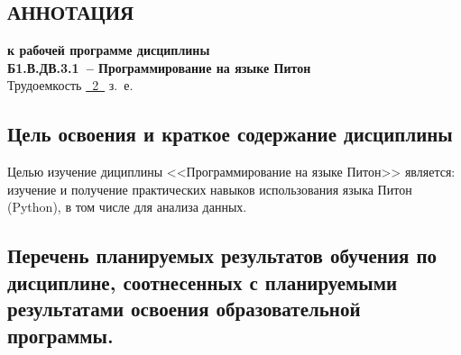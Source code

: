 \documentclass[a4paper,12pt]{article}
\begin{document}
\newpage


\begin{center}
\section{АННОТАЦИЯ}
  {\bf к рабочей программе дисциплины\\
  Б1.В.ДВ.3.1\ -- Программирование на языке Питон} \\
  Трудоемкость \uline{~2~} з.~е.
\end{center}


\subsection{Цель освоения и краткое содержание дисциплины}
  
  Целью изучение дициплины <<Программирование на языке Питон>> является: изучение и получение практических навыков использования языка Питон (Python), в том числе для анализа данных.
  


\subsection{Перечень планируемых результатов обучения по дисциплине, соотнесенных с планируемыми результатами освоения образовательной программы.}
\end{document}
